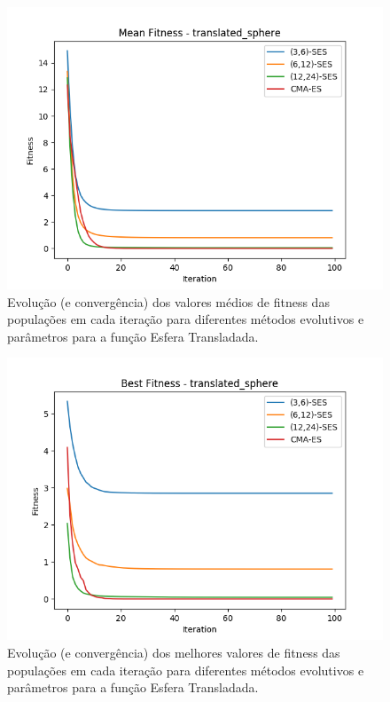 \documentclass[conference]{IEEEtran}
\begin{document}
\begin{figure}[htbp]
\centering
\centerline{\includegraphics[scale=0.5]{imagens/translated_sphere/mean_fitness.png}}
\caption{Evolução (e convergência) dos valores médios de fitness das populações em cada iteração para diferentes métodos evolutivos e parâmetros para a função Esfera Transladada.}
\label{translated_sphere/mean_fitness}
\end{figure}

\begin{figure}[htbp]
\centering
\centerline{\includegraphics[scale=0.5]{imagens/translated_sphere/best_fitness.png}}
\caption{Evolução (e convergência) dos melhores valores de fitness das populações em cada iteração para diferentes métodos evolutivos e parâmetros para a função Esfera Transladada.}
\label{translated_sphere/best_fitness}
\end{figure}
\end{document}
